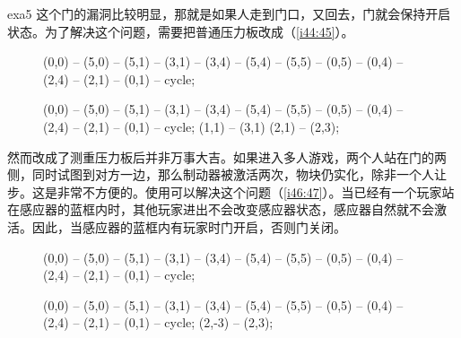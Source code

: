 \begin{example}{}{exa5}
  这个门的漏洞比较明显，那就是如果人走到门口，又回去，门就会保持开启状态。为了解决这个问题，需要把普通压力板改成（\autoref{i44:45}）。

  \begin{figure}[H]
    \centering
    \begin{tikzpictureC}[TRsch]
       (0,0) -- (5,0) -- (5,1) -- (3,1) -- (3,4) -- (5,4) -- (5,5) -- (0,5) -- (0,4) -- (2,4) -- (2,1) -- (0,1) -- cycle;
    \end{tikzpictureC}%
    \begin{tikzpictureC}[TRsch]
       (0,0) -- (5,0) -- (5,1) -- (3,1) -- (3,4) -- (5,4) -- (5,5) -- (0,5) -- (0,4) -- (2,4) -- (2,1) -- (0,1) -- cycle;
        (1,1) -- (3,1)
        (2,1) -- (2,3);
    \end{tikzpictureC}%
    \caption{}
    \label{i44:45}
  \end{figure}

  然而改成了测重压力板后并非万事大吉。如果进入多人游戏，两个人站在门的两侧，同时试图到对方一边，那么制动器被激活两次，物块仍实化，除非一个人让步。这是非常不方便的。使用可以解决这个问题（\autoref{i46:47}）。当已经有一个玩家站在感应器的蓝框内时，其他玩家进出不会改变感应器状态，感应器自然就不会激活。因此，当感应器的蓝框内有玩家时门开启，否则门关闭。

  \begin{figure}[H]
    \centering
    \begin{tikzpictureC}[TRsch]
       (0,0) -- (5,0) -- (5,1) -- (3,1) -- (3,4) -- (5,4) -- (5,5) -- (0,5) -- (0,4) -- (2,4) -- (2,1) -- (0,1) -- cycle;
    \end{tikzpictureC}%
    \begin{tikzpictureC}[TRsch]
       (0,0) -- (5,0) -- (5,1) -- (3,1) -- (3,4) -- (5,4) -- (5,5) -- (0,5) -- (0,4) -- (2,4) -- (2,1) -- (0,1) -- cycle;
       (2,-3) -- (2,3);
    \end{tikzpictureC}%
    \caption{}
    \label{i46:47}
  \end{figure}
\end{example}

